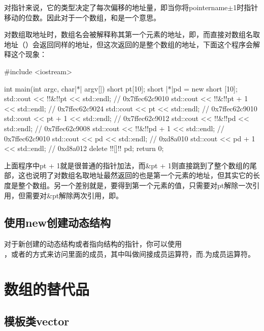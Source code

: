 对指针来说，它的类型决定了每次偏移的地址量，即当你将pointername$\pm$1时指针移动的位数。因此对于一个数组，和是一个意思。

对数组取地址时，数组名会被解释称其第一个元素的地址，即，而直接对数组名取地址（）会返回同样的地址，但这次返回的是整个数组的地址，下面这个程序会解释这个现象：

\begin{cpp}
#include <iostream>

int main(int argc, char|*| argv[]) {
    short pt[10];
    short |*|pd = new short [10];
    std::cout << !!&!!pt << std::endl; // 0x7ffec62c9010
    std::cout << !!&!!pt + 1 << std::endl; // 0x7ffec62c9024
    std::cout << pt << std::endl; // 0x7ffec62c9010
    std::cout << pt + 1 << std::endl; // 0x7ffec62c9012
    std::cout << !!&!!pd << std::endl; // 0x7ffec62c9008
    std::cout << !!&!!pd + 1 << std::endl; // 0x7ffec62c9010
    std::cout << pd << std::endl; // 0xd8a010
    std::cout << pd + 1 << std::endl; // 0xd8a012
    delete !![]!! pd;
    return 0;
}
\end{cpp}

上面程序中pt + 1就是很普通的指针加法，而\&pt + 1则直接跳到了整个数组的尾部，这也说明了对数组名取地址最然返回的也是第一个元素的地址，但其实它的长度是整个数组。另一个差别就是，要得到第一个元素的值，只需要对pt解除一次引用，但需要对\&pt解除两次引用，即。

\addtocounter{subsection}{1}

\subsection{使用new创建动态结构}

对于新创建的动态结构或者指向结构的指针，你可以使用\\ ，或者的方式来访问里面的成员，其中\fira{->}叫做间接成员运算符，而.为成员运算符。

\addtocounter{section}{1}

\section{数组的替代品}

\subsection{模板类vector}

